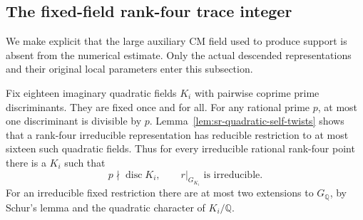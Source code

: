 \subsection{The fixed-field rank-four trace integer}
\label{subsec:sr-rank-four-trace-integer}
We make explicit that the large auxiliary CM field used to
produce support is absent from the numerical estimate.
Only the actual descended representations and their original
local parameters enter this subsection.

Fix eighteen imaginary quadratic fields \(K_i\) with
pairwise coprime prime discriminants.
They are fixed once and for all.
For any rational prime \(p\), at most one discriminant
is divisible by \(p\).
Lemma~\ref{lem:sr-quadratic-self-twists} shows that
a rank-four irreducible representation has reducible
restriction to at most sixteen such quadratic fields.
Thus for every irreducible rational rank-four point
there is a \(K_i\) such that
\[
           p\nmid\operatorname{disc}K_i,\qquad
                         r|_{G_{K_i}}\text{ is irreducible}.
 \tag{Q1}
\]
For an irreducible fixed restriction there are at most
two extensions to \(G_{\mathbb Q}\), by Schur's lemma
and the quadratic character of \(K_i/\mathbb Q\).

